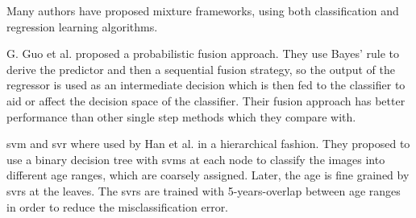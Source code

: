 Many authors have proposed mixture frameworks, using both classification and regression learning algorithms. 

G. Guo et al. \cite{4563041} proposed a probabilistic fusion approach. They use Bayes' rule to derive the predictor and then a sequential fusion strategy, so the output of the regressor is used as an intermediate decision which is then fed to the classifier to aid or affect the decision space of the classifier. Their fusion approach has better performance than other single step methods which they compare with.

\gls{svm} and \gls{svr} where used by Han et al. \cite{han:age} in a hierarchical fashion. They proposed to use a binary decision tree with \glspl{svm} at each node to classify the images into different age ranges, which are coarsely assigned. Later, the age is fine grained by \glspl{svr} at the leaves. The \glspl{svr} are trained with 5-years-overlap between age ranges in order to reduce the misclassification error.


